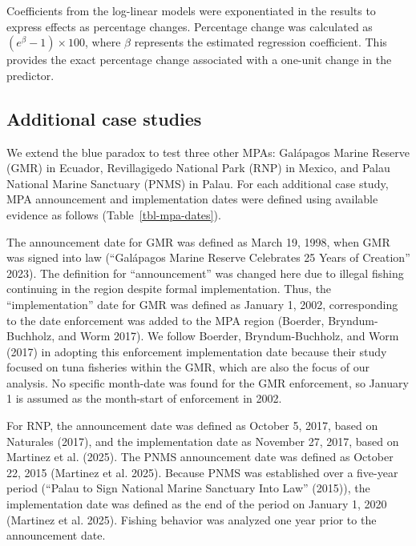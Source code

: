 \documentclass[
  letterpaper,
  DIV=11,
  numbers=noendperiod]{scrartcl}
\begin{document}
Coefficients from the log-linear models were exponentiated in the
results to express effects as percentage changes. Percentage change was
calculated as \((e^{\beta}-1) \times 100\), where \(\beta\) represents
the estimated regression coefficient. This provides the exact percentage
change associated with a one-unit change in the predictor.

\subsection{Additional case studies}\label{additional-case-studies}

We extend the blue paradox to test three other MPAs: Galápagos Marine
Reserve (GMR) in Ecuador, Revillagigedo National Park (RNP) in Mexico,
and Palau National Marine Sanctuary (PNMS) in Palau. For each additional
case study, MPA announcement and implementation dates were defined using
available evidence as follows (Table~\ref{tbl-mpa-dates}).

The announcement date for GMR was defined as March 19, 1998, when GMR
was signed into law ({``Galápagos {Marine Reserve Celebrates} 25 {Years}
of {Creation}''} 2023). The definition for ``announcement'' was changed
here due to illegal fishing continuing in the region despite formal
implementation. Thus, the ``implementation'' date for GMR was defined as
January 1, 2002, corresponding to the date enforcement was added to the
MPA region (Boerder, Bryndum-Buchholz, and Worm 2017). We follow
Boerder, Bryndum-Buchholz, and Worm (2017) in adopting this enforcement
implementation date because their study focused on tuna fisheries within
the GMR, which are also the focus of our analysis. No specific
month-date was found for the GMR enforcement, so January 1 is assumed as
the month-start of enforcement in 2002.

For RNP, the announcement date was defined as October 5, 2017, based on
Naturales (2017), and the implementation date as November 27, 2017,
based on Martinez et al. (2025). The PNMS announcement date was defined
as October 22, 2015 (Martinez et al. 2025). Because PNMS was established
over a five-year period ({``Palau to {Sign National Marine Sanctuary
Into Law}''} (2015)), the implementation date was defined as the end of
the period on January 1, 2020 (Martinez et al. 2025). Fishing behavior
was analyzed one year prior to the announcement date.
\end{document}
